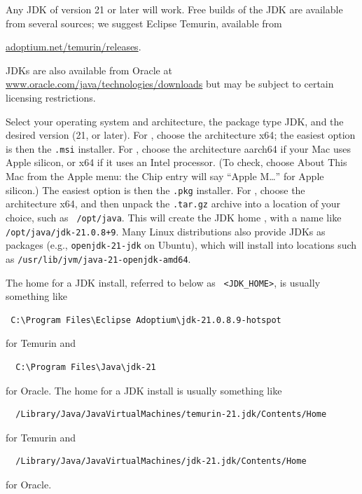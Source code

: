 Any JDK of version 21 or later will work. Free builds of the JDK are
available from several sources; we suggest Eclipse Temurin, available
from

\href{https://adoptium.net/temurin/releases/}%
{adoptium.net/temurin/releases}.

\begin{sideblock}
JDKs are also available from Oracle at 
\href{https://www.oracle.com/java/technologies/downloads/}%
{www.oracle.com/java/technologies/downloads} 
but may be subject to certain licensing restrictions.
\end{sideblock}

Select your operating system and architecture, the package type {\sf
JDK}, and the desired version (21, or later).
\ifWindows
For \SYSTEM{}, choose the architecture {\sf x64}; the easiest option
is then the {\tt .msi} installer.
\fi
\ifMacOS
For \SYSTEM{}, choose the architecture {\sf aarch64} if your Mac uses
Apple silicon, or {\sf x64} if it uses an Intel processor. (To check,
choose {\sf About This Mac} from the Apple menu: the {\sf Chip} entry
will say ``Apple M\ldots'' for Apple silicon.) The easiest option is
then the {\tt .pkg} installer.
\fi
\ifLinux
For \SYSTEM{}, choose the architecture {\sf x64}, and then unpack the
{\tt .tar.gz} archive into a location of your choice, such as {\tt
/opt/java}. This will create the JDK home \directory{}, with a name like
{\tt /opt/java/jdk-21.0.8+9}.  Many Linux distributions also provide JDKs
as packages (e.g., {\tt openjdk-21-jdk} on Ubuntu), which will install
into locations such as {\tt /usr/lib/jvm/java-21-openjdk-amd64}.
\fi

\ifWindows
The home \directory{} for a JDK install, referred to below as {\tt
<JDK\_HOME>}, is usually something like
\begin{verbatim}
 C:\Program Files\Eclipse Adoptium\jdk-21.0.8.9-hotspot
\end{verbatim}
for Temurin and 
\begin{verbatim}
  C:\Program Files\Java\jdk-21
\end{verbatim}
for Oracle.
\fi
\ifMacOS
The home \directory{} for a JDK install is usually something like 
\begin{verbatim}
  /Library/Java/JavaVirtualMachines/temurin-21.jdk/Contents/Home
\end{verbatim}
for Temurin and 
\begin{verbatim}
  /Library/Java/JavaVirtualMachines/jdk-21.jdk/Contents/Home
\end{verbatim}
for Oracle.
\fi

